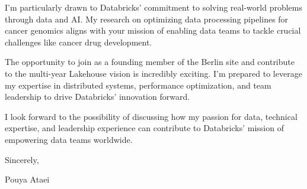 \documentclass[11pt,a4paper]{article}
\begin{document}
I'm particularly drawn to Databricks' commitment to solving real-world problems through data and AI. My research on optimizing data processing pipelines for cancer genomics aligns with your mission of enabling data teams to tackle crucial challenges like cancer drug development.

The opportunity to join as a founding member of the Berlin site and contribute to the multi-year Lakehouse vision is incredibly exciting. I'm prepared to leverage my expertise in distributed systems, performance optimization, and team leadership to drive Databricks' innovation forward.

I look forward to the possibility of discussing how my passion for data, technical expertise, and leadership experience can contribute to Databricks' mission of empowering data teams worldwide.

\vspace{1em}

Sincerely,

\vspace{2em}

Pouya Ataei
\end{document}
